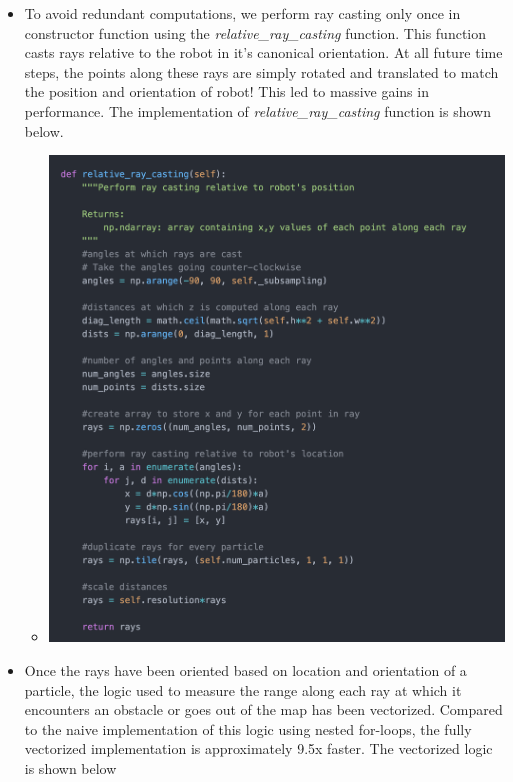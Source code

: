 \documentclass[12pt, a4paper]{article}
\begin{document}
\begin{itemize}
  \item To avoid redundant computations, we perform ray casting only once in constructor function using the \textit{relative\_ray\_casting} function. This function casts rays relative to the robot in it's canonical orientation. At all future time steps, the points along these rays are simply rotated and translated to match the position and orientation of robot! This led to massive gains in performance. The implementation of \textit{relative\_ray\_casting} function is shown below.
  \begin{itemize}
    \item 
    \begin{minipage}[t]{\linewidth}
      \vspace{0pt}
      \begin{center}
        \includegraphics[scale=0.3]{./results/ray_casting_opt_1.png}
        \label{fig:sm_1}
      \end{center}
    \end{minipage}
  \end{itemize}
  \item Once the rays have been oriented based on location and orientation of a particle, the logic used to measure the range along each ray at which it encounters an obstacle or goes out of the map has been vectorized. Compared to the naive implementation of this logic using nested for-loops, the fully vectorized implementation is approximately 9.5x faster.  The vectorized logic is shown below

\end{itemize}
\end{document}
